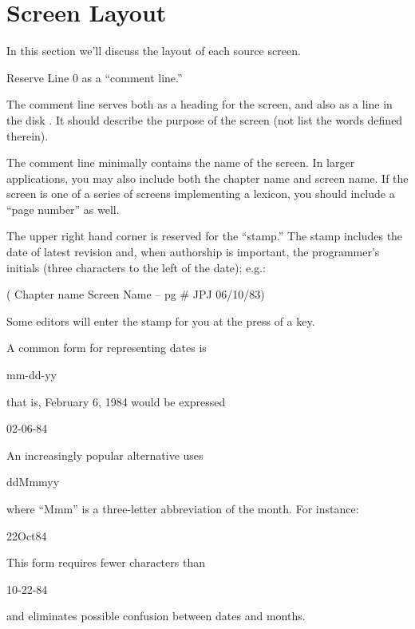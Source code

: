 \section{Screen Layout}%
%

In this section we'll discuss the layout of each source screen.

%
\begin{tip}
Reserve Line 0 as a ``comment line.''
\end{tip}
The comment line serves both as a heading for the screen, and also as
a line in the disk .  It should describe the purpose of
the screen (not list the words defined therein).

The comment line minimally contains the name of the screen.  In larger
applications, you may also include both the chapter name and screen
name.  If the screen is one of a series of screens implementing a
lexicon, you should include a ``page number'' as well.

%
The upper right hand corner is reserved for the ``stamp.'' The stamp
includes the date of latest revision and, when authorship is
important, the programmer's initials (three characters to the left of
the date); e.g.:
\begin{Code}
( Chapter name        Screen Name -- pg #      JPJ 06/10/83)
\end{Code}
Some \Forth{} editors will enter the stamp for you at the press of a key.

A common form for representing dates is
\begin{Code}
mm-dd-yy
\end{Code}
that is, February 6, 1984 would be expressed
\begin{Code}
02-06-84
\end{Code}
An increasingly popular alternative uses
\begin{Code}
ddMmmyy
\end{Code}
where ``Mmm'' is a three-letter abbreviation of the month.  For instance:
\begin{Code}
22Oct84
\end{Code}
This form requires fewer characters than
\begin{Code}
10-22-84
\end{Code}
and eliminates possible confusion between dates and months.%
%

